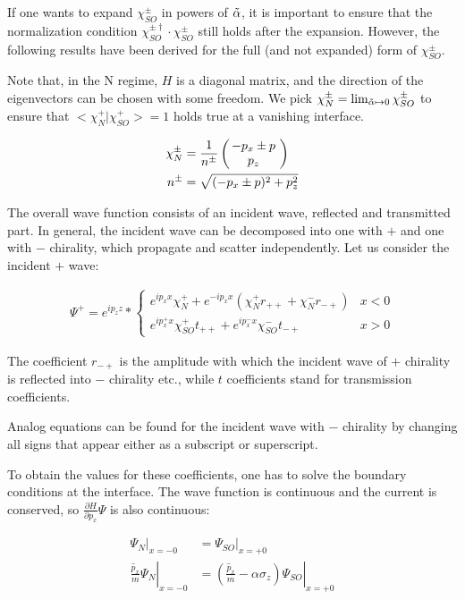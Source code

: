 If one wants to expand $\chi_{SO}^\pm$ in powers of $\tilde \alpha$, it is
important to ensure that the normalization condition
$\chi_{SO}^{\pm\dagger} \cdot \chi_{SO}^\pm$ still holds after the
expansion. However, the following results have been derived for the
full (and not expanded) form of $\chi_{SO}^\pm$.

Note that, in the N regime, $H$ is a diagonal matrix, and the direction
of the eigenvectors can be chosen with some freedom. We pick
$\chi_N^{\pm} = \lim_{\tilde \alpha \mapsto 0} \chi_{SO}^{\pm}$ to ensure that
$<\chi_N^+|\chi_{SO}^+> = 1$ holds true at a vanishing interface.

\begin{align}
   \chi_N^{\pm} &= \frac{1}{n^{\pm}} 
                      \left(\hspace{-.8ex}\begin{array}{c}-p_x \pm p\\p_z\end{array}\hspace{-.4ex}\right) \\
    n^{\pm} &= \sqrt{(-p_x \pm p)^2 + p_z^2}
\end{align}


The overall wave function consists of an incident wave, 
reflected and transmitted part. In general, the incident wave can
be decomposed into one with $+$ and one with $-$ chirality, which
propagate and scatter independently. Let us consider the incident $+$
wave:

\begin{align}
    \Psi^+ = e^{i p_z z} * \left\{
        \begin{array}{ll}
            e^{i p_x x} \chi_N^+ + e^{- i p_x x} (\chi_N^+ r_{++} +
                    \chi_N^- r_{-+})    & x < 0\\
            e^{i p_x^+ x} \chi_{SO}^+ t_{++} + e^{i p_x^- x}
            \chi_{SO}^- t_{-+}          & x > 0
        \end{array} \right.
        \label{eq:chiral-wafe-function}
\end{align}

The coefficient $r_{-+}$ is the amplitude with which the incident wave
of $+$ chirality is reflected into $-$ chirality etc., while $t$
coefficients stand for transmission coefficients.

Analog equations can be found for the incident wave with $-$ chirality
by changing all signs that appear either as a subscript or
superscript.

To obtain the values for these coefficients, one has to solve the
boundary conditions at the interface. The wave function is continuous
and the current is conserved, so $\frac{\partial H}{\partial p_x} \Psi$ is also
continuous:

\begin{align}
    \Psi_N|_{x = -0}    &= \Psi_{SO}|_{x = +0} \label{eq:continuous}\\
    \left.\frac{\hat p_x}{m} \Psi_N\right|_{x = -0}
                        &= \left. \left(\frac{\hat p_x}{m} -\alpha \sigma_z\right)
                                \Psi_{SO}\right|_{x = +0}
\end{align}

